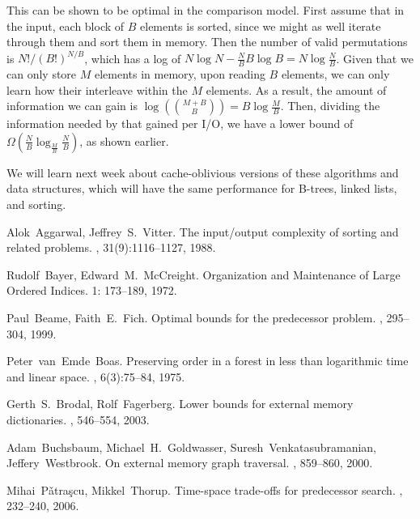 \documentclass[11pt]{article}
\begin{document}
This can be shown to be optimal in the comparison model. First assume that in the input, each block of $B$ elements is sorted, since we might as well iterate through them and sort them in memory. Then the number of valid permutations is $N!/(B!)^{N/B}$, which has a log of $ N \log N - \frac{N}{B} B \log B = N \log {\frac{N}{B}}$. Given that we can only store $M$ elements in memory, upon reading $B$ elements, we can only learn how their interleave within the $M$ elements. As a result, the amount of information we can gain is $\log({M+B \choose B}) = B \log {\frac{M}{B}}$. Then, dividing the information needed by that gained per I/O, we have a lower bound of $\Omega(\frac{N}{B} \log_{\frac{M}{B}} \frac{N}{B})$, as shown earlier.

We will learn next week about cache-oblivious versions of these algorithms and data structures, which will have the same performance for B-trees, linked lists, and sorting.



\begin{thebibliography}{42}

Alok~Aggarwal, Jeffrey~S.~Vitter.
\newblock The input/output complexity of sorting and related problems.
, 31(9):1116--1127, 1988.

Rudolf~Bayer, Edward~M.~McCreight.
\newblock Organization and Maintenance of Large Ordered Indices.
 1: 173--189, 1972.

Paul~Beame, Faith~E.~Fich.
\newblock Optimal bounds for the predecessor problem.
, 295--304, 1999.

Peter~van~Emde~Boas.
\newblock Preserving order in a forest in less than logarithmic time and linear space.
, 6(3):75--84, 1975.

Gerth~S.~Brodal, Rolf~Fagerberg.
\newblock Lower bounds for external memory dictionaries.
, 546--554, 2003.

Adam~Buchsbaum, Michael~H.~Goldwasser, Suresh~Venkatasubramanian, Jeffery~Westbrook.
\newblock On external memory graph traversal.
, 859--860, 2000.

Mihai~P\v{a}tra\c{s}cu, Mikkel~Thorup.
\newblock Time-space trade-offs for predecessor search.
, 232--240, 2006.

\end{thebibliography}
\end{document}
